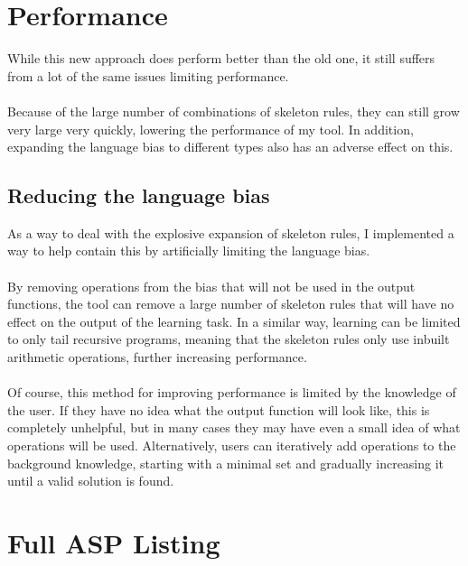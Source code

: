 \section{Performance}
While this new approach does perform better than the old one, it still suffers from a lot of the same issues limiting performance. \\ \\
Because of the large number of combinations of skeleton rules, they can still grow very large very quickly, lowering the performance of my tool. In addition, expanding the language bias to different types also has an adverse effect on this.

\subsection{Reducing the language bias}
As a way to deal with the explosive expansion of skeleton rules, I implemented a way to help contain this by artificially limiting the language bias. \\ \\
By removing operations from the bias that will not be used in the output functions, the tool can remove a large number of skeleton rules that will have no effect on the output of the learning task. In a similar way, learning can be limited to only tail recursive programs, meaning that the skeleton rules only use inbuilt arithmetic operations, further increasing performance. \\ \\
Of course, this method for improving performance is limited by the knowledge of the user. If they have no idea what the output function will look like, this is completely unhelpful, but in many cases they may have even a small idea of what operations will be used. Alternatively, users can iteratively add operations to the background knowledge, starting with a minimal set and gradually increasing it until a valid solution is found.

\pagebreak
\section{Full ASP Listing}


\pagebreak
%
%